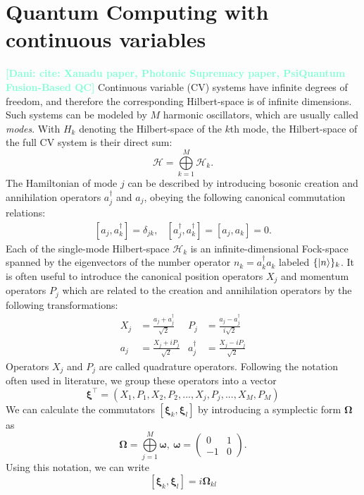 \documentclass[12pt, a4paper,  nobibnotes]{article}
\newcommand{\nd}[1]{\textcolor{Aquamarine}{\textbf{[Dani: #1]}}}
\begin{document}
\section{Quantum Computing with continuous variables}
\nd{cite: Xanadu paper, Photonic Supremacy paper, PsiQuantum Fusion-Based QC}
Continuous variable (CV) systems have infinite degrees of freedom, and therefore the corresponding Hilbert-space is of infinite dimensions. 
Such systems can be modeled by $M$ harmonic oscillators, which are usually called \textit{modes}. 
With $H_k$ denoting the Hilbert-space of the $k$th mode, the Hilbert-space of the full CV system is their direct sum:
\begin{equation}
    \mathcal H = \bigoplus\limits_{k=1}^M\mathcal H_k.
\end{equation}
The Hamiltonian of mode $j$ can be described by introducing bosonic creation and annihilation operators $a_j^\dagger$ and $a_j$, obeying the following canonical commutation relations:
\begin{align}
    \left[a_j, a_k^\dagger \right] = \delta_{jk}, & \left[a_j^\dagger, a_k^\dagger\right] = \left[a_j, a_k\right] = 0.
\end{align}
Each of the single-mode Hilbert-space $\mathcal H_k$ is an infinite-dimensional Fock-space spanned by the eigenvectors 
of the number operator $n_k = a_k^\dagger a_k$ labeled $\{\ket{n}\}_k$.
It is often useful to introduce the canonical position operators $X_j$ and momentum operators $P_j$ which are related to the creation and annihilation operators
by the following transformations:
\begin{align}
  X_j &= \frac{a_j+a_j^\dagger}{\sqrt{2}}  &  P_j &= \frac{a_j-a_j^\dagger}{i\sqrt{2}} \\ 
  a_j &= \frac{X_j + iP_j}{\sqrt{2}}       & a_j^\dagger &= \frac{X_j - iP_j}{\sqrt{2}}
   \label{eq:jwtransform}
\end{align}
Operators $X_j$ and $P_j$ are called quadrature operators. Following the notation often used in literature, we group these operators into a vector 
\begin{equation}
    \pmb\xi^\top = (X_1, P_1, X_2, P_2, ..., X_j, P_j, ..., X_M, P_M)
    \label{eq:xidef}
\end{equation}
We can calculate the commutators $\left[\pmb\xi_k,\pmb\xi_l\right]$ by introducing a symplectic form $\pmb\Omega$ as
\begin{equation}
    \pmb\Omega = \bigoplus\limits_{j=1}^{M}\pmb\omega,~\pmb\omega = 
    \begin{pmatrix}
    0 & 1 \\
    -1 & 0
    \end{pmatrix}.
\end{equation}
Using this notation, we can write
\begin{equation}
    \left[\pmb\xi_k,\pmb\xi_l\right] = i\pmb\Omega_{kl}
\end{equation}
\end{document}
